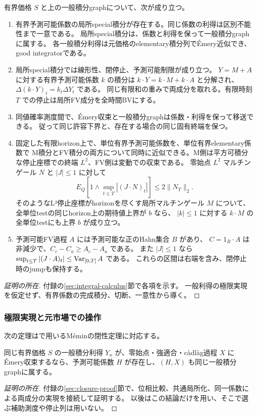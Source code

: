 \begin{theorem}[積分の基本則と評価]\label{thm:integral-input}
有界価格 $S$ と上の一般積分graphについて、次が成り立つ。
\begin{enumerate}
\item 有界予測可能係数の局所special積分が存在する。同じ係数の利得は区別不能性まで一意である。
局所special積分は、係数と利得を保って一般積分graphに属する。
各一般積分利得は元価格のelementary積分列でÉmery近似でき、good integratorである。
\item 局所special積分では線形性、閉停止、予測可能制限が成り立つ。
$Y=M+A$ に対する有界予測可能係数 $k$ の積分は
$k\cdot Y=k\cdot M+k\cdot A$ と分解され、
$\Delta(k\cdot Y)_t=k_t\Delta Y_t$ である。
同じ有限和の重みで両成分を取れる。有限時刻 $T$ での停止は局所FV成分を全時間BVにする。
\item 同値確率測度間で、Émery収束と一般積分graphは係数・利得を保って移送できる。
従って同じ許容下界と、存在する場合の同じ固有終端を保つ。
\item 固定した有限horizon上で、単位有界予測可能係数を、単位有界elementary係数で
M積分とFV積分の両方について同時に近似できる。M側は平方可積分な停止座標での終端 $L^2$、FV側は変動での収束である。
零始点 $L^2$ マルチンゲール $N$ と $|J|\leq1$ に対して
\[
 E_Q[1\wedge\sup_{t\leq T}|(J\cdot N)_t|]\leq2\|N_T\|_2.
\]
そのようなL²停止座標がhorizonを尽くす局所マルチンゲール $M$ について、
全単位testの同じhorizon上の期待値上界が $b$ なら、
$|k|\leq1$ に対する $k\cdot M$ の全単位testにも上界 $b$ が成り立つ。
\item 予測可能FV過程 $A$ には予測可能な正のHahn集合 $B$ があり、
$C=1_B\cdot A$ は非減少で、$C_c-C_a\geq A_c-A_a$ である。
また $|J|\leq1$ なら $\sup_{t\leq T}|(J\cdot A)_t|\leq\operatorname{Var}_{[0,T]}A$ である。
これらの区間は右端を含み、閉停止時のjumpも保持する。
\end{enumerate}
\end{theorem}
\begin{proof}[証明の所在]
付録の\ref{sec:integral-calculus}節で各項を示す。
一般利得の極限実現を仮定せず、有界係数の完成積分、切断、一意性から導く。
\end{proof}

\subsubsection{極限実現と元市場での操作}
次の定理は\cite[Theorem 4.2の証明]{DS}で用いるM\'eminの閉性定理\cite{Memin80}に対応する。
\begin{theorem}[一般積分graphの閉性]\label{thm:graph-closure}
同じ有界価格 $S$ の一般積分利得 $Y_n$ が、零始点・強適合・càdlàg過程 $X$ に
Émery収束するなら、予測可能係数 $H$ が存在し、$(H,X)$ も同じ一般積分graphに属する。
\end{theorem}
\begin{proof}[証明の所在]
付録の\ref{sec:closure-proof}節で、位相比較、共通局所化、同一係数による両成分の実現を接続して証明する。
以後はこの結論だけを用い、そこで選ぶ補助測度や停止列は用いない。
\end{proof}

